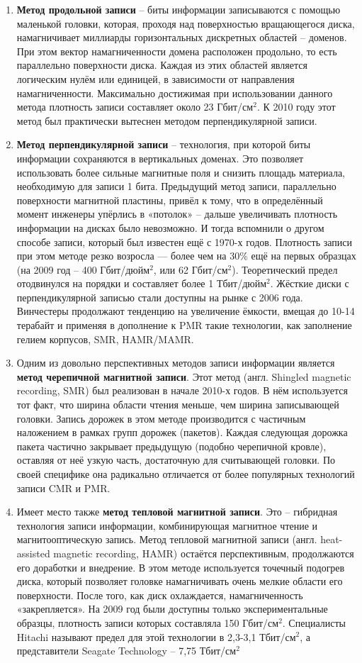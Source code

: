 \documentclass[bachelor, och, referat]{SCWorks}
\begin{document}
\begin{enumerate}
    \item \textbf{Метод продольной записи} -- биты информации записываются с помощью маленькой головки, которая, проходя над поверхностью вращающегося диска, намагничивает миллиарды горизонтальных дискретных областей -- доменов. При этом вектор намагниченности домена расположен продольно, то есть параллельно поверхности диска. Каждая из этих областей является логическим нулём или единицей, в зависимости от направления намагниченности. Максимально достижимая при использовании данного метода плотность записи составляет около 23 Гбит/см$^2$. К 2010 году этот метод был практически вытеснен методом перпендикулярной записи.
    \item \textbf{Метод перпендикулярной записи} -- технология, при которой биты информации сохраняются в вертикальных доменах. Это позволяет использовать более сильные магнитные поля и снизить площадь материала, необходимую для записи 1 бита. Предыдущий метод записи, параллельно поверхности магнитной пластины, привёл к тому, что в определённый момент инженеры упёрлись в «потолок» -- дальше увеличивать плотность информации на дисках было невозможно. И тогда вспомнили о другом способе записи, который был известен ещё с 1970-х годов. Плотность записи при этом методе резко возросла — более чем на 30\% ещё на первых образцах (на 2009 год -- 400 Гбит/дюйм$^2$, или 62 Гбит/см$^2$). Теоретический предел отодвинулся на порядки и составляет более 1 Тбит/дюйм$^2$. Жёсткие диски с перпендикулярной записью стали доступны на рынке с 2006 года. Винчестеры продолжают тенденцию на увеличение ёмкости, вмещая до 10-14 терабайт и применяя в дополнение к PMR такие технологии, как заполнение гелием корпусов, SMR, HAMR/MAMR.
    \item Одним из довольно перспективных методов записи информации является \textbf{метод черепичной магнитной записи}. Этот метод (англ. Shingled magnetic recording, SMR) был реализован в начале 2010-х годов. В нём используется тот факт, что ширина области чтения меньше, чем ширина записывающей головки. Запись дорожек в этом методе производится с частичным наложением в рамках групп дорожек (пакетов). Каждая следующая дорожка пакета частично закрывает предыдущую (подобно черепичной кровле), оставляя от неё узкую часть, достаточную для считывающей головки. По своей специфике она радикально отличается от более популярных технологий записи CMR и PMR.
    \item Имеет место также \textbf{метод тепловой магнитной записи}. Это -- гибридная технология записи информации, комбинирующая магнитное чтение и магнитооптическую запись. Метод тепловой магнитной записи (англ. heat-assisted magnetic recording, HAMR) остаётся перспективным, продолжаются его доработки и внедрение. В этом методе используется точечный подогрев диска, который позволяет головке намагничивать очень мелкие области его поверхности. После того, как диск охлаждается, намагниченность «закрепляется». На 2009 год были доступны только экспериментальные образцы, плотность записи которых составляла 150 Гбит/см$^2$. Специалисты Hitachi называют предел для этой технологии в 2,3-3,1 Тбит/см$^2$, а представители Seagate Technology -- 7,75 Тбит/см$^2$

\end{enumerate}
\end{document}
